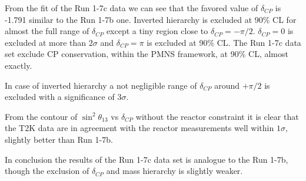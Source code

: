 From the fit of the Run 1-7c data we can see that the favored value of $\delta_{CP}$ is -1.791
similar to the Run 1-7b one.
Inverted hierarchy is excluded at 90\% CL for almost the full range of $\delta_{CP}$ except a tiny region close to $\delta_{CP} = -\pi/2$.
$\delta_{CP}=0$ is excluded at more than $2\sigma$ and $\delta_{CP}=\pi$ is excluded at 90\% CL.
The Run 1-7c data set exclude CP conservation, within the PMNS framework, at 90\% CL, almost exactly. 

In case of inverted hierarchy a not negligible range of $\delta_{CP}$ around $+\pi/2$ is excluded with 
a significance of $3\sigma$.

From the contour of $\sin^2 \theta_{13}$ vs $\delta_{CP}$ without the reactor constraint 
it is clear that the T2K data are in agreement with the reactor measurements well within $1\sigma$,
slightly better than Run 1-7b.

In conclusion the results of the Run 1-7c data set is analogue to the Run 1-7b, 
though the exclusion of $\delta_{CP}$ and mass hierarchy is slightly weaker.





\clearpage
